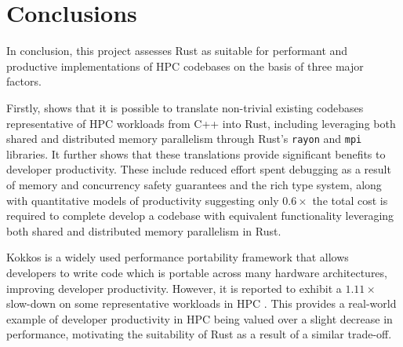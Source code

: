 \chapter{Conclusions}
\label{ch:conclusions}


In conclusion, this project assesses Rust as suitable for performant and productive implementations of \acrshort{HPC} codebases on the basis of three major factors.

Firstly,  shows that it is possible to translate non-trivial existing codebases representative of \acrshort{HPC} workloads from C++ into Rust, including leveraging both shared and distributed memory parallelism through Rust's \texttt{rayon} and \texttt{mpi} libraries. It further shows that these translations provide significant benefits to developer productivity. These include reduced effort spent debugging as a result of memory and concurrency safety guarantees and the rich type system, along with quantitative models of productivity suggesting only $0.6 \times$ the total cost is required to complete develop a codebase with equivalent functionality leveraging both shared and distributed memory parallelism in Rust.

Kokkos is a widely used performance portability framework that allows developers to write code which is portable across many hardware architectures, improving developer productivity. However, it is reported to exhibit a $1.11 \times$ slow-down on some representative workloads in \acrshort{HPC} \cite{carteredwardsKokkosEnablingManycore2014}. This provides a real-world example of developer productivity in \acrshort{HPC} being valued over a slight decrease in performance, motivating the suitability of Rust as a result of a similar trade-off.

